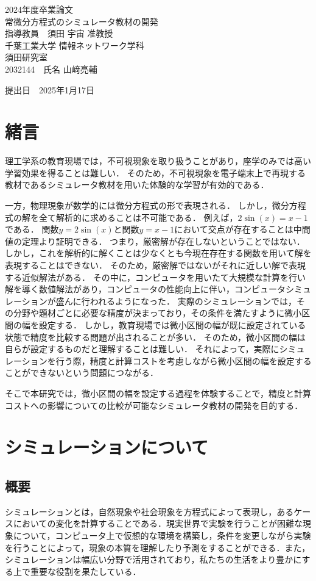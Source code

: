 \documentclass[a4paper, 12pt]{ltjsarticle}
\newcommand{\coverpage}{
\begin{titlepage}
\begin{center}
\vspace*{1.5cm}

{\LARGE 2024年度卒業論文}\\[2cm] %

{\Huge {常微分方程式のシミュレータ教材の開発}}\\[4cm] %

{\LARGE 指導教員　須田 宇宙 准教授}\\[2cm] %
{\LARGE 千葉工業大学 情報ネットワーク学科}\\[0.5cm] %

{\LARGE 須田研究室}\\[2.5cm] %

{\LARGE {2032144}　氏名 {山﨑亮輔}} \\[1.5cm] %

\vfill
\end{center}

\begin{flushright}
{\LARGE 提出日　\textnormal{2025年1月17日}}\\[1.5cm] %
\end{flushright}

\vfill
\end{titlepage}
}
\begin{document}
\coverpage

\tableofcontents

\clearpage

\section{緒言}
理工学系の教育現場では，不可視現象を取り扱うことがあり，座学のみでは高い学習効果を得ることは難しい．
そのため，不可視現象を電子端末上で再現する教材であるシミュレータ教材を用いた体験的な学習が有効的である\cite{suda2018}．

一方，物理現象が数学的には微分方程式の形で表現される．
しかし，微分方程式の解を全て解析的に求めることは不可能である．
例えば，$2\sin(x)=x-1$である．
関数$y=2\sin(x)$と関数$y=x-1$において交点が存在することは中間値の定理より証明できる．
つまり，厳密解が存在しないということではない．
しかし，これを解析的に解くことは少なくとも今現在存在する関数を用いて解を表現することはできない．
そのため，厳密解ではないがそれに近しい解で表現する近似解法がある．
その中に，コンピュータを用いたて大規模な計算を行い解を導く数値解法があり，コンピュータの性能向上に伴い，コンピュータシミュレーションが盛んに行われるようになった．
実際のシミュレーションでは，その分野や題材ごとに必要な精度が決まっており，その条件を満たすように微小区間の幅を設定する．
しかし，教育現場では微小区間の幅が既に設定されている状態で精度を比較する問題が出されることが多い．
そのため，微小区間の幅は自らが設定するものだと理解することは難しい．
それによって，実際にシミュレーションを行う際，精度と計算コストを考慮しながら微小区間の幅を設定することができないという問題につながる．

そこで本研究では，微小区間の幅を設定する過程を体験することで，精度と計算コストへの影響についての比較が可能なシミュレータ教材の開発を目的する．
\clearpage
\section{シミュレーションについて}
\subsection{概要}
シミュレーションとは，自然現象や社会現象を方程式によって表現し，あるケースにおいての変化を計算することである．現実世界で実験を行うことが困難な現象について，コンピュータ上で仮想的な環境を構築し，条件を変更しながら実験を行うことによって，現象の本質を理解したり予測をすることができる．また，シミュレーションは幅広い分野で活用されており，私たちの生活をより豊かにする上で重要な役割を果たしている．
\end{document}

